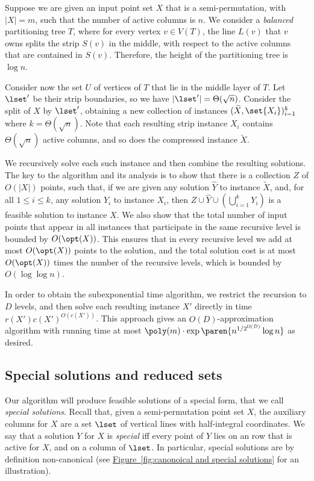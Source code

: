 \documentclass[11pt]{article}
\numberwithin{equation}{section}
\theoremstyle{definition}
\theoremstyle{plain}
\newcommand{\expref}[2]{\hyperref[#2]{#1~\ref{#2}}}
\begin{document}
Suppose we are given an input point set $X$ that is a semi-permutation, with $|X|=m$, such that the number of active columns is $n$. We consider a \emph{balanced} partitioning tree $T$, where for every vertex $v\in V(T)$, the line $L(v)$ that $v$ owns splits the strip $S(v)$ in the middle, with respect to the active columns that are contained in $S(v)$. Therefore, the height of the partitioning tree is $\log n$.

Consider now the set $U$ of vertices of $T$ that lie in the middle layer of $T$. Let $\lset'$ be their strip boundaries, so we have $|\lset'| = \Theta(\sqrt{n})$. Consider the split of $X$ by $\lset'$,  obtaining a new collection of instances $(\widetilde{X}, \set{X_i})_{i=1}^k$ where $k = \Theta(\sqrt{n})$. Note that each resulting strip instance $X_i$ contains $\Theta(\sqrt{n})$ active columns, and so does the compressed instance $\widetilde{X}$.
 
We recursively solve each such instance and then  combine the resulting solutions.
The key to the algorithm and its analysis is to show that there is a collection $Z$ of $O(|X|)$ points, such that, if we are given any  solution $\widehat{Y}$ to instance $\widetilde{X}$, and, for all $1\leq i\leq k$, any  solution $Y_i$ to instance $X_i$, then $Z\cup \widehat{Y}\cup \left(\bigcup_{i=1}^k Y_i\right) $ is a feasible solution to instance $X$. We also show that the total number of input points that appear in all instances that participate in the same recursive level is bounded by $O(\opt(X))$. This ensures that in every recursive level we add at most $O(\opt(X))$ points to the solution, and the total solution cost is at most $O(\opt(X))$ times the number of the recursive levels, which is bounded by $O(\log\log n)$.

In order to obtain the subexponential time algorithm, we restrict the recursion to $D$ levels, and then solve each resulting instance $X'$ directly in time $r(X') c(X')^{O(c(X'))}$. %
This approach gives an $O(D)$-approximation algorithm with running time at most  $\poly(m)\cdot \exp\paren{n^{1/2^{\Omega(D)}} \log n}$ as desired. 
%
%

%
%
%
%

\subsection{Special solutions and reduced sets} %

Our algorithm will produce feasible solutions of a special form, that we call \emph{special solutions}. Recall that, given a semi-permutation point set $X$, the auxiliary columns for $X$ are a set $\lset$ of vertical lines with half-integral coordinates. We say that a solution $Y$ for $X$ is \emph{special} iff every point of $Y$ lies on an row that is active for $X$, and on a column of $\lset$. In particular, special solutions are by definition non-canonical (see \expref{Figure}{fig:canonoical and special solutions} for an illustration).  
\end{document}
